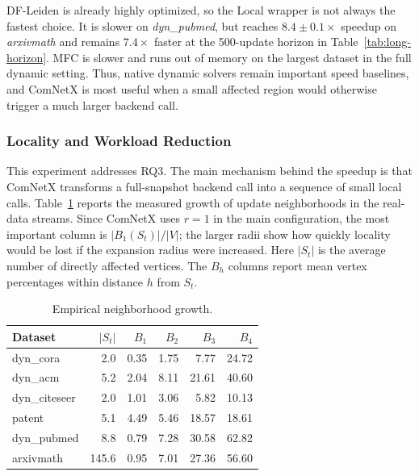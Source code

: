 \documentclass[conference]{IEEEtran}
\theoremstyle{definition}
\begin{document}
DF-Leiden is already highly optimized, so the Local wrapper is not always the
fastest choice. It is slower on \textit{dyn\_pubmed}, but reaches
$8.4\pm0.1\times$ speedup on \textit{arxivmath} and remains $7.4\times$ faster
at the 500-update horizon in Table~\ref{tab:long-horizon}. MFC is slower and
runs out of memory on the largest dataset in the full dynamic setting. Thus,
native dynamic solvers remain
important speed baselines, and ComNetX is most useful when a small affected
region would otherwise trigger a much larger backend call.

\subsubsection{Locality and Workload Reduction}

This experiment addresses RQ3.
The main mechanism behind the speedup is that ComNetX transforms a full-snapshot
backend call into a sequence of small local calls. Table~\ref{tab:workload}
reports the measured growth of update neighborhoods in the real-data streams.
Since ComNetX uses $r=1$ in the main configuration, the most important column
is $|B_1(S_t)|/|V|$; the larger radii show how quickly locality would be lost
if the expansion radius were increased.
Here $|S_t|$ is the average number of directly affected vertices. The $B_h$
columns report mean vertex percentages within distance $h$ from $S_t$.

\begin{table}[!b]
\centering
\caption{Empirical neighborhood growth.}
\label{tab:workload}
\setlength{\tabcolsep}{2pt}
\scriptsize
\begin{tabular}{@{}lrrrrr@{}}
\toprule
\textbf{Dataset} & \textbf{$|S_t|$} &
\textbf{$B_1$} & \textbf{$B_2$} & \textbf{$B_3$} & \textbf{$B_4$} \\
\midrule
dyn\_cora     & 2.0   & 0.35 & 1.75 & 7.77  & 24.72 \\
dyn\_acm      & 5.2   & 2.04 & 8.11 & 21.61 & 40.60 \\
dyn\_citeseer & 2.0   & 1.01 & 3.06 & 5.82  & 10.13 \\
patent        & 5.1   & 4.49 & 5.46 & 18.57 & 18.61 \\
dyn\_pubmed   & 8.8   & 0.79 & 7.28 & 30.58 & 62.82 \\
arxivmath     & 145.6 & 0.95 & 7.01 & 27.36 & 56.60 \\
\bottomrule
\end{tabular}
\end{table}
\end{document}
